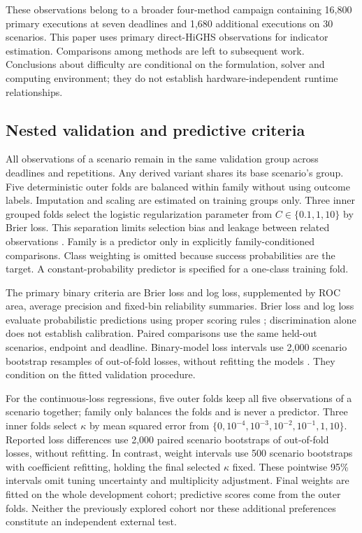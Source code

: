 These observations belong to a broader four-method campaign containing
16,800 primary executions at seven deadlines and 1,680 additional executions
on 30 scenarios. This paper uses primary direct-HiGHS observations for
indicator estimation. Comparisons among methods are left to subsequent work.
Conclusions about difficulty are conditional on the formulation, solver and
computing environment; they do not establish hardware-independent runtime
relationships.

\subsection{Nested validation and predictive criteria}
All observations of a scenario remain in the same validation group across
deadlines and repetitions. Any derived variant shares its base scenario's
group. Five deterministic outer folds are balanced within family without
using outcome labels. Imputation and scaling are estimated on training
groups only. Three inner grouped folds select the logistic regularization
parameter from $C\in\{0.1,1,10\}$ by Brier loss. This separation limits
selection bias and leakage between related observations
\citep{cawley2010,roberts2017,kapoor2023}. Family is a predictor only in
explicitly family-conditioned comparisons. Class weighting is omitted
because success probabilities are the target. A constant-probability
predictor is specified for a one-class training fold.

The primary binary criteria are Brier loss and log loss, supplemented by
ROC area, average precision and fixed-bin reliability summaries. Brier loss
and log loss evaluate probabilistic predictions using proper scoring rules
\citep{brier1950,gneiting2007}; discrimination alone does not establish
calibration. Paired comparisons use the same held-out scenarios, endpoint
and deadline. Binary-model loss intervals use 2,000 scenario bootstrap
resamples of out-of-fold losses, without refitting the models
\citep{efron1979}. They condition on the fitted validation procedure.

For the continuous-loss regressions, five outer folds keep all five
observations of a scenario together; family only balances the folds and
is never a predictor. Three inner folds select $\kappa$ by mean squared
error from $\{0,10^{-4},10^{-3},10^{-2},10^{-1},1,10\}$.
Reported loss differences use 2,000 paired scenario bootstraps of
out-of-fold losses, without refitting. In contrast, weight intervals use
500 scenario bootstraps with coefficient refitting, holding the final
selected $\kappa$ fixed. These pointwise 95\% intervals omit tuning
uncertainty and multiplicity adjustment. Final weights are fitted on the
whole development cohort; predictive scores come from the outer folds.
Neither the previously explored cohort nor these additional preferences
constitute an independent external test.


